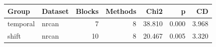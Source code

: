 \begin{tabular}{llrrrrr}
\toprule
Group & Dataset & Blocks & Methods & Chi2 & p & CD \\
\midrule
temporal & nrcan & 7 & 8 & 38.810 & 0.000 & 3.968 \\
shift & nrcan & 10 & 8 & 20.467 & 0.005 & 3.320 \\
\bottomrule
\end{tabular}
